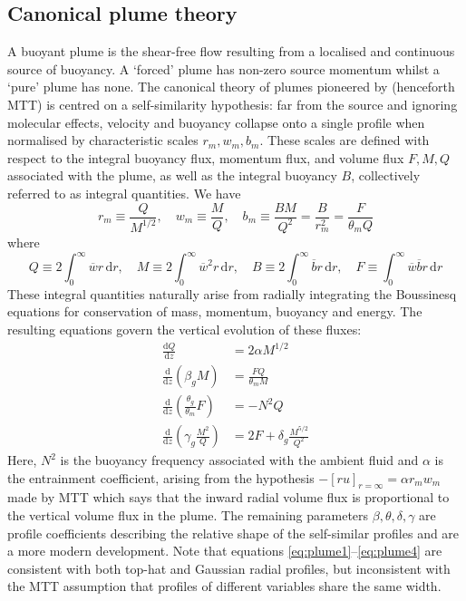\documentclass[a4paper]{article}
\begin{document}
\subsection{Canonical plume theory}

A buoyant plume is the shear-free flow resulting from a localised and continuous source of buoyancy. A
`forced' plume has non-zero source momentum whilst a `pure' plume has none. The
canonical theory of plumes pioneered by \citet{mtt} (henceforth MTT) is centred on a
self-similarity hypothesis: far from the source and ignoring molecular effects, velocity
and buoyancy collapse onto a single profile when normalised by characteristic scales $r_m, w_m, b_m$.
These scales are defined with respect to the integral buoyancy flux, momentum flux, and volume flux $F, M, Q$
associated with the plume, as well as the integral buoyancy $B$, collectively referred to as integral
quantities. We have
\begin{equation}
	r_m \equiv \frac{Q}{M^{1/2}}, \hspace{1em} w_m \equiv \frac{M}{Q}, \hspace{1em} b_m \equiv \frac{BM}{Q^2} =
	\frac{B}{r_m^2} = \frac{F}{\theta_m Q}
\end{equation}
where 
\begin{equation}
	Q \equiv 2\int_0^\infty \overline{w}r \, \mathrm{d}r, \hspace{1em} M \equiv 2\int_0^\infty \overline{w}^2
	r\, \mathrm{d}r, \hspace{1em} B \equiv 2 \int_0^\infty \overline{b}r\,\mathrm{d}r, \hspace{1em} F \equiv
	\int_0^\infty \overline{w}\overline{b}r\,\mathrm{d}r
	\label{eq:intquant}
\end{equation}
These integral quantities naturally arise from radially integrating the Boussinesq equations for conservation
of mass, momentum, buoyancy and energy. The resulting equations govern the vertical evolution of these fluxes:
\begin{align}
		\frac{\mathrm{d}Q}{\mathrm{d}z} &= 2\alpha M^{1/2} \label{eq:plume1}\\ 
		\frac{\mathrm{d}}{\mathrm{d}z}\left(\beta_g M \right) &= \frac{FQ}{\theta_m M} \label{eq:plume2}\\
		\frac{\mathrm{d}}{\mathrm{d}z}\left(\frac{\theta_g}{\theta_m} F\right) &= -N^2 Q\label{eq:plume3} \\ 
		\frac{\mathrm{d}}{\mathrm{d}z}\left(\gamma_g\frac{M^2}{Q}\right) &= 2F + \delta_g \frac{M^{5/2}}{Q^2}
		\label{eq:plume4}
\end{align}
Here, $N^2$ is the buoyancy frequency associated with the ambient fluid and $\alpha$ is the entrainment
coefficient, arising from the hypothesis $-\left[ru\right]_{r=\infty} = \alpha r_m w_m$ made by MTT which says
that the inward radial volume flux is proportional to the vertical volume flux in the plume. The
remaining parameters $\beta, \theta, \delta, \gamma$ are profile coefficients describing the relative shape of
the self-similar profiles and are a more modern development. Note that equations
\eqref{eq:plume1}--\eqref{eq:plume4} are consistent with both top-hat and Gaussian radial profiles, but
inconsistent with the MTT assumption that profiles of different variables share the same width.
\end{document}
